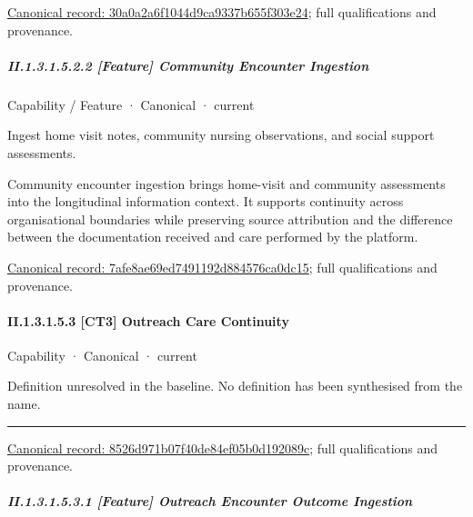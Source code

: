 {\footnotesize \href{../../../../../../../continuum/strategy/capability/feature/30a0a2a6f1044d9ca9337b655f303e24.md}{Canonical record: 30a0a2a6f1044d9ca9337b655f303e24}; full qualifications and provenance.}\par
\subparagraph*{II.1.3.1.5.2.2 [Feature] Community Encounter Ingestion}
\label{navigation:II.1.3.1.5.2.2}

\label{element:7afe8ae69ed7491192d884576ca0dc15}
{\small Capability / Feature · Canonical · current}\par

Ingest home visit notes, community nursing observations, and social support assessments.



Community encounter ingestion brings home-visit and community assessments into the longitudinal information context. It supports continuity across organisational boundaries while preserving source attribution and the difference between the documentation received and care performed by the platform.


{\footnotesize \href{../../../../../../../continuum/strategy/capability/feature/7afe8ae69ed7491192d884576ca0dc15.md}{Canonical record: 7afe8ae69ed7491192d884576ca0dc15}; full qualifications and provenance.}\par
\paragraph*{II.1.3.1.5.3 [CT3] Outreach Care Continuity}
\label{navigation:II.1.3.1.5.3}

\label{element:8526d971b07f40de84ef05b0d192089c}
{\small Capability · Canonical · current}\par

Definition unresolved in the baseline. No definition has been synthesised from the name.



\medskip\hrule\medskip

{\footnotesize \href{../../../../../../../continuum/strategy/capability/8526d971b07f40de84ef05b0d192089c.md}{Canonical record: 8526d971b07f40de84ef05b0d192089c}; full qualifications and provenance.}\par
\subparagraph*{II.1.3.1.5.3.1 [Feature] Outreach Encounter Outcome Ingestion}
\label{navigation:II.1.3.1.5.3.1}

